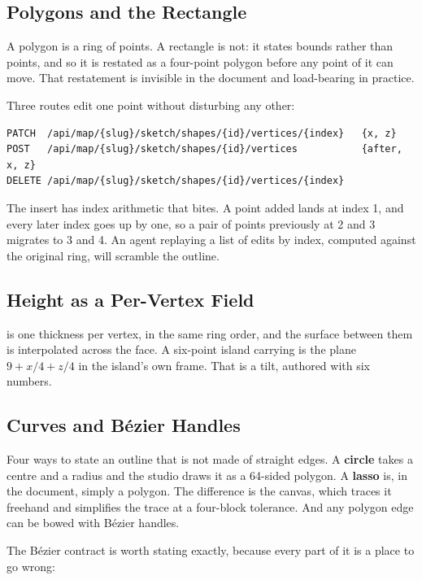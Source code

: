 \subsection{Polygons and the Rectangle}

A polygon is a ring of points. A rectangle is not: it states bounds rather than
points, and so it is restated as a four-point polygon before any point of it can
move. That restatement is invisible in the document and load-bearing in practice.

Three routes edit one point without disturbing any other:

\begin{lstlisting}
PATCH  /api/map/{slug}/sketch/shapes/{id}/vertices/{index}   {x, z}
POST   /api/map/{slug}/sketch/shapes/{id}/vertices           {after, x, z}
DELETE /api/map/{slug}/sketch/shapes/{id}/vertices/{index}
\end{lstlisting}

The insert has index arithmetic that bites. A point added  lands at
index 1, and every later index goes up by one, so a pair of points previously at
2 and 3 migrates to 3 and 4. An agent replaying a list of edits by index, computed
against the original ring, will scramble the outline.

\subsection{Height as a Per-Vertex Field}

 is one thickness per vertex, in the same ring order, and the
surface between them is interpolated across the face. A six-point island carrying
\id{[9, 12, 16, 17, 17, 14]} is the plane $9 + x/4 + z/4$ in the island's own
frame. That is a tilt, authored with six numbers.

\subsection{Curves and B\'ezier Handles}

Four ways to state an outline that is not made of straight edges. A \textbf{circle}
takes a centre and a radius and the studio draws it as a 64-sided polygon. A
\textbf{lasso} is, in the document, simply a polygon. The difference is the
canvas, which traces it freehand and simplifies the trace at a four-block
tolerance. And any polygon edge can be bowed with Bézier handles.

The Bézier contract is worth stating exactly, because every part of it is a place
to go wrong:

